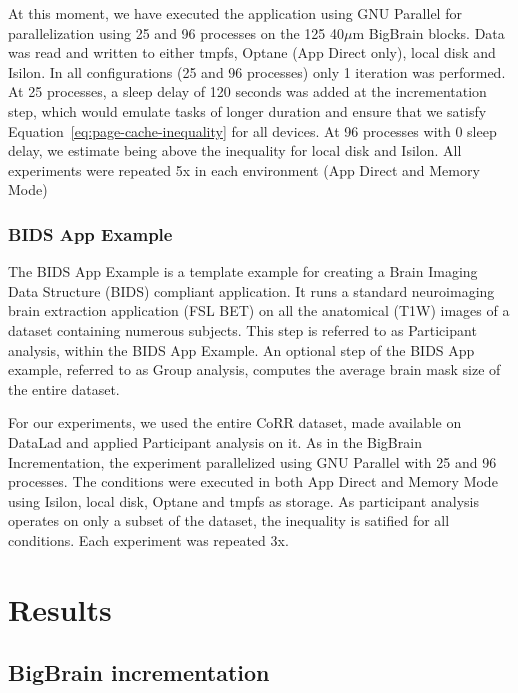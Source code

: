 \documentclass[conference]{IEEEtran}
\newcommand{\bigbrain}{BigBrain }
\begin{document}
At this moment, we have executed the application using GNU Parallel for parallelization
using 25 and 96 processes on the 125 40$\mu$m \bigbrain blocks. Data was read and written to either
tmpfs, Optane (App Direct only), local disk and Isilon. In all configurations (25 and 96 processes)
only 1 iteration was performed. At 25 processes, a sleep delay of 120 seconds was added at the
incrementation step, which would emulate tasks of longer duration and ensure that we satisfy Equation~\ref{eq:page-cache-inequality} for all devices.
At 96 processes with 0 sleep delay, we estimate being above the inequality for local disk and Isilon.
All experiments were repeated 5x in each environment (App Direct and Memory Mode)

\subsubsection{BIDS App Example}

The BIDS App Example is a template example for creating a Brain Imaging Data Structure (BIDS)
compliant application. It runs a standard neuroimaging brain extraction application (FSL BET) 
on all the anatomical (T1W) images of a dataset containing numerous subjects. This step is 
referred to as Participant analysis, within the BIDS App Example. An optional
step of the BIDS App example, referred to as Group analysis, computes the average brain
mask size of the entire dataset.

For our experiments, we used the entire CoRR dataset, made available on DataLad and
applied Participant analysis on it. As in the BigBrain Incrementation, the experiment parallelized 
using GNU Parallel with 25 and 96 processes. The conditions were executed in both App Direct and Memory Mode
using Isilon, local disk, Optane and tmpfs as storage. As participant analysis operates on only a subset of the dataset,
the inequality is satified for all conditions. Each experiment was repeated 3x.
\section{Results}

\subsection{\bigbrain incrementation}
\end{document}
